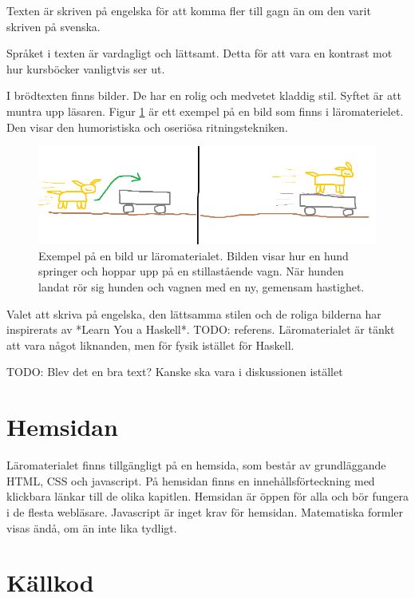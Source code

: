 \begin{binge}
Texten är skriven på engelska för att komma fler till gagn än om den varit skriven på svenska.

Språket i texten är vardagligt och lättsamt. Detta för att vara en kontrast mot hur kursböcker vanligtvis ser ut.

I brödtexten finns bilder. De har en rolig och medvetet kladdig stil. Syftet är att muntra upp läsaren. Figur \ref{fig:smakprov_bild_laromaterial} är ett exempel på en bild som finns i läromaterielet. Den visar den humoristiska och oseriösa ritningstekniken.

\begin{figure}
  \includegraphics[width=\linewidth]{figure/smakprov_bild_laromaterial.png}
  \caption{Exempel på en bild ur läromaterialet. Bilden visar hur en hund springer och hoppar upp på en stillastående vagn. När hunden landat rör sig hunden och vagnen med en ny, gemensam hastighet.}
  \label{fig:smakprov_bild_laromaterial}
\end{figure}

Valet att skriva på engelska, den lättsamma stilen och de roliga bilderna har inspirerats av *Learn You a Haskell*. TODO: referens. Läromaterialet är tänkt att vara något liknanden, men för fysik istället för Haskell.

TODO: Blev det en bra text? Kanske ska vara i diskussionen istället

\section{Hemsidan}

Läromaterialet finns tillgängligt på en hemsida, som består av grundläggande HTML, CSS och javascript. På hemsidan finns en innehållsförteckning med klickbara länkar till de olika kapitlen. Hemsidan är öppen för alla och bör fungera i de flesta webläsare. Javascript är inget krav för hemsidan. Matematiska formler visas ändå, om än inte lika tydligt.

\section{Källkod}


\end{binge}
